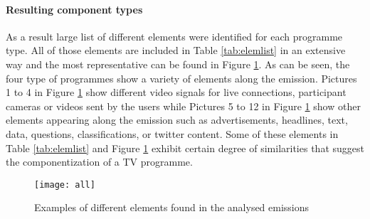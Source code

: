 \paragraph{Resulting component types}

As a result large list of different elements were identified for each programme type. All of those elements are included in Table \ref{tab:elemlist} in an extensive way and the most representative can be found in Figure \ref{fig:examples}. As can be seen, the four type of programmes show a variety of elements along the emission. Pictures 1 to 4 in Figure \ref{fig:examples} show different video signals for live connections, participant cameras or videos sent by the users while Pictures 5 to 12 in  Figure \ref{fig:examples} show other elements appearing along the emission such as advertisements, headlines, text, data, questions, classifications, or twitter content. Some of these elements in Table \ref{tab:elemlist} and Figure \ref{fig:examples} exhibit certain degree of similarities that suggest the componentization of a TV programme.



\begin{figure}	
	\begin{center}
		\texttt{[image: all]}
		\caption{Examples of different elements found in the analysed emissions}
		\label{fig:examples}
	\end{center}
\end{figure} 


